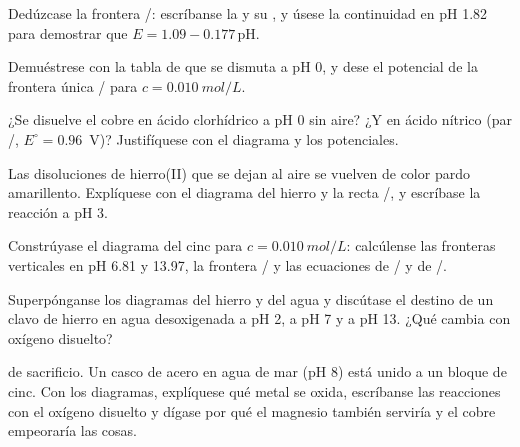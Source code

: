 \begin{exercise}[$\star\star$]\label{exo:b1:e-ph-diagrams:6}
Dedúzcase la frontera /: escríbanse la 
y su , y úsese la continuidad en pH 1.82 para demostrar
que $E = 1.09 -
0.177\,\mathrm{pH}$.
\end{exercise}

\begin{exercise}[$\star\star$]\label{exo:b1:e-ph-diagrams:7}
Demuéstrese con la tabla de  que  se dismuta
a pH 0, y dese el potencial de la frontera única / para
$c = \qty{0.010}{mol/L}$.
\end{exercise}

\begin{exercise}[$\star\star$]\label{exo:b1:e-ph-diagrams:8}
¿Se disuelve el cobre en ácido clorhídrico a pH 0 sin aire? ¿Y en ácido
nítrico (par /, $E^\circ = 0.96$~V)? Justifíquese con el
diagrama y los potenciales.
\end{exercise}

\begin{exercise}[$\star\star$]\label{exo:b1:e-ph-diagrams:9}
Las disoluciones de hierro(II) que se dejan al aire se vuelven de color
pardo amarillento. Explíquese con el diagrama del hierro y la recta
/, y escríbase la reacción a pH 3.
\end{exercise}

\begin{exercise}[$\star\star\star$]\label{exo:b1:e-ph-diagrams:10}
Constrúyase el diagrama del cinc para $c = \qty{0.010}{mol/L}$:
calcúlense las fronteras verticales en pH 6.81 y 13.97, la frontera
/ y las ecuaciones de / y de
/.
\end{exercise}

\begin{exercise}[$\star\star\star$]\label{exo:b1:e-ph-diagrams:11}
Superpónganse los diagramas del hierro y del agua y discútase el destino
de un clavo de hierro en agua desoxigenada a pH 2, a pH 7 y a pH 13. ¿Qué
cambia con oxígeno disuelto?
\end{exercise}

\begin{exercise}[$\star\star\star$]\label{exo:b1:e-ph-diagrams:12}
 de sacrificio. Un casco de acero en agua de mar (pH 8) está unido
a un bloque de cinc. Con los diagramas, explíquese qué metal se oxida,
escríbanse las reacciones con el oxígeno disuelto y dígase por qué el
magnesio también serviría y el cobre empeoraría las cosas.
\end{exercise}

